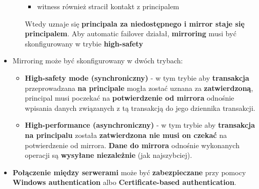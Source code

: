 \documentclass[a4paper]{article}
\begin{document}
\begin{itemize}
\begin{itemize}
\begin{itemize}
                \item witness również stracił kontakt z principalem
            \end{itemize}
            Wtedy uznaje się \textbf{principala za niedostępnego i mirror staje się principalem}. Aby automatic failover działał, \textbf{mirroring} musi być skonfigurowany w trybie \textbf{high-safety}
        \end{itemize}
        \item Mirroring może być skonfigurowany w dwóch trybach:
        \begin{itemize}
            \item \textbf{High-safety mode (synchroniczny)} - w tym trybie aby \textbf{transakcja} przeprowadzana \textbf{na principale} mogła zostać uznana za \textbf{zatwierdzoną}, principal musi poczekać na \textbf{potwierdzenie od mirrora} odnośnie wpisania danych związanych z tą transakcją do jego dziennika transakcji.
            \item \textbf{High-performance (asynchroniczny)} - w tym trybie aby \textbf{transakcja na principalu} została \textbf{zatwierdzona nie musi on czekać} na potwierdzenie od mirrora. \textbf{Dane do mirrora} odnośnie wykonanych operacji są \textbf{wysyłane niezależnie} (jak najszybciej).
        \end{itemize}
        \item \textbf{Połączenie między serwerami} może być \textbf{zabezpieczane} przy pomocy \textbf{Windows authentication} albo \textbf{Certificate-based authentication}.
    \end{itemize}
\end{document}
